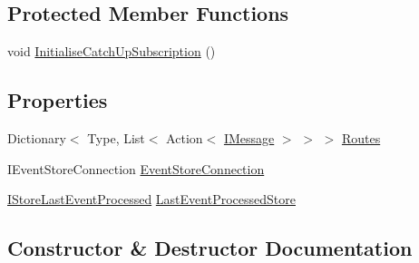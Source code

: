 \subsection*{Protected Member Functions}
\begin{DoxyCompactItemize}
\item 
void \hyperlink{classCqrs_1_1EventStore_1_1Bus_1_1EventStoreEventPublisher_a145dd61678031747b4c1768e68937181_a145dd61678031747b4c1768e68937181}{Initialise\+Catch\+Up\+Subscription} ()
\end{DoxyCompactItemize}
\subsection*{Properties}
\begin{DoxyCompactItemize}
\item 
Dictionary$<$ Type, List$<$ Action$<$ \hyperlink{interfaceCqrs_1_1Messages_1_1IMessage}{I\+Message} $>$ $>$ $>$ \hyperlink{classCqrs_1_1EventStore_1_1Bus_1_1EventStoreEventPublisher_a89bf01d1921bc517ea8b385c0ee724ee_a89bf01d1921bc517ea8b385c0ee724ee}{Routes}
\item 
I\+Event\+Store\+Connection \hyperlink{classCqrs_1_1EventStore_1_1Bus_1_1EventStoreEventPublisher_a16df48a7203bc3bcde5f5a12f1d47934_a16df48a7203bc3bcde5f5a12f1d47934}{Event\+Store\+Connection}
\item 
\hyperlink{interfaceCqrs_1_1Bus_1_1IStoreLastEventProcessed}{I\+Store\+Last\+Event\+Processed} \hyperlink{classCqrs_1_1EventStore_1_1Bus_1_1EventStoreEventPublisher_a552a16f86c52837bf81200778e3a9fe4_a552a16f86c52837bf81200778e3a9fe4}{Last\+Event\+Processed\+Store}
\end{DoxyCompactItemize}


\subsection{Constructor \& Destructor Documentation}
\mbox{\label{classCqrs_1_1EventStore_1_1Bus_1_1EventStoreEventPublisher_a4ca16479fe387fae0135865ae3f889d7_a4ca16479fe387fae0135865ae3f889d7}} 
